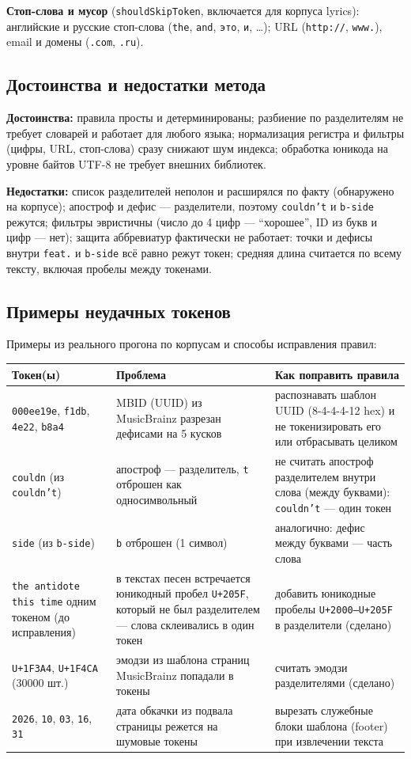 \textbf{Стоп-слова и мусор} (\texttt{shouldSkipToken}, включается для корпуса
lyrics): английские и русские стоп-слова (\texttt{the}, \texttt{and},
\texttt{это}, \texttt{и}, \ldots); URL (\texttt{http://}, \texttt{www.}),
email и домены (\texttt{.com}, \texttt{.ru}).

\subsection{Достоинства и недостатки метода}
\textbf{Достоинства:} правила просты и детерминированы; разбиение по
разделителям не требует словарей и работает для любого языка; нормализация
регистра и фильтры (цифры, URL, стоп-слова) сразу снижают шум индекса;
обработка юникода на уровне байтов UTF-8 не требует внешних библиотек.

\textbf{Недостатки:} список разделителей неполон и расширялся по факту
(обнаружено на корпусе); апостроф и дефис --- разделители, поэтому
\texttt{couldn’t} и \texttt{b-side} режутся; фильтры эвристичны (число до 4
цифр --- \enquote{хорошее}, ID из букв и цифр --- нет); защита аббревиатур
фактически не работает: точки и дефисы внутри \texttt{feat.} и \texttt{b-side}
всё равно режут токен; средняя длина считается по всему тексту, включая
пробелы между токенами.

\subsection{Примеры неудачных токенов}
Примеры из реального прогона по корпусам и способы исправления правил:

\begin{tabular}{|p{4.6cm}|p{4.4cm}|p{5.6cm}|}
\hline
Токен(ы) & Проблема & Как поправить правила \\ \hline
\texttt{000ee19e}, \texttt{f1db}, \texttt{4e22}, \texttt{b8a4} &
MBID (UUID) из MusicBrainz разрезан дефисами на 5 кусков &
распознавать шаблон UUID (8-4-4-4-12 hex) и не токенизировать его
или отбрасывать целиком \\ \hline
\texttt{couldn} (из \texttt{couldn’t}) & апостроф --- разделитель,
\texttt{t} отброшен как односимвольный & не считать апостроф
разделителем внутри слова (между буквами): \texttt{couldn’t} ---
один токен \\ \hline
\texttt{side} (из \texttt{b-side}) & \texttt{b} отброшен (1 символ) &
аналогично: дефис между буквами --- часть слова \\ \hline
\texttt{the antidote this time} одним токеном (до исправления) &
в текстах песен встречается юникодный пробел \texttt{U+205F}, который не
был разделителем --- слова склеивались в один токен & добавить юникодные
пробелы \texttt{U+2000--U+205F} в разделители (сделано) \\ \hline
\texttt{U+1F3A4}, \texttt{U+1F4CA} (30000 шт.) & эмодзи из шаблона страниц
MusicBrainz попадали в токены & считать эмодзи разделителями (сделано) \\ \hline
\texttt{2026}, \texttt{10}, \texttt{03}, \texttt{16}, \texttt{31} &
дата обкачки из подвала страницы режется на шумовые токены &
вырезать служебные блоки шаблона (footer) при извлечении текста \\ \hline
\end{tabular}

